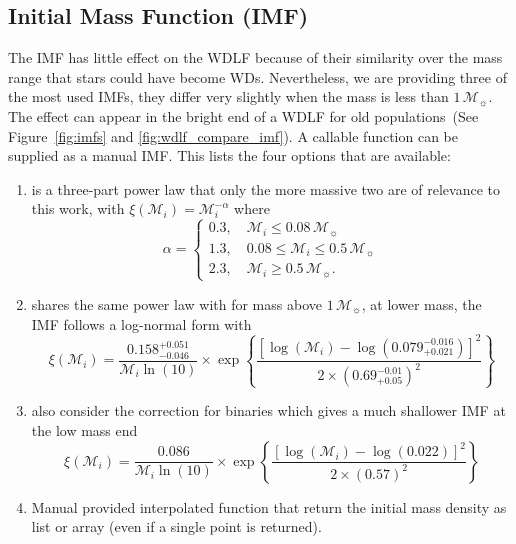 \documentclass[fleqn,usenatbib]{rasti}
\newcommand{\msun}{\mathcal{M}_{\sun}}
\begin{document}
\subsection{Initial Mass Function (IMF)}
The IMF has little effect on the WDLF because of their similarity over the mass
range that stars could have become WDs. Nevertheless, we are providing three
of the most used IMFs, they differ very slightly when the mass is less than
$1\,\msun$. The effect can appear in the bright end of a WDLF for old
populations~(See Figure~\ref{fig:imfs} and \ref{fig:wdlf_compare_imf}). A
callable function can be supplied as a manual IMF. This lists the four options
that are available:

\begin{enumerate}
    \item \citet{2001MNRAS.322..231K} is a three-part power law that only the
    more massive two are of relevance to this work, with
    $\xi(\mathcal{M}_i) = \mathcal{M}_i^{-\alpha}$ where
    \begin{equation}
        \alpha =
        \begin{cases}
            0.3, \quad \mathcal{M}_i \leq 0.08\,\msun\\
            1.3, \quad 0.08 \leq \mathcal{M}_i \leq 0.5\,\msun\\
            2.3, \quad \mathcal{M}_i \geq 0.5\,\msun.
        \end{cases}
    \end{equation}
    \item \citet{2003PASP..115..763C} shares the same power law with
    \citet{2001MNRAS.322..231K} for mass above $1\,\msun$, at lower mass,
    the IMF follows a log-normal form with
    \begin{equation}
        \xi(\mathcal{M}_i) = \dfrac{0.158^{+0.051}_{-0.046}}{\mathcal{M}_i \ln(10)} \times
            \exp{\left\{\dfrac{\left[\log(\mathcal{M}_i) - \log\left(0.079^{-0.016}_{+0.021}\right)\right]^2}{2 \times (0.69^{-0.01}_{+0.05})^2}\right\}}
    \end{equation}
    \item \citet[][including binary]{2003PASP..115..763C} also consider the correction for binaries which gives a much shallower IMF at the low mass end
    \begin{equation}
        \xi(\mathcal{M}_i) = \dfrac{0.086}{\mathcal{M}_i \ln(10)} \times
            \exp{\left\{\dfrac{\left[\log(\mathcal{M}_i) - \log\left(0.022\right)\right]^2}{2 \times (0.57)^2}\right\}}
    \end{equation}
    \item Manual provided interpolated function that return the initial mass density as list or array (even if a single point is returned).
\end{enumerate}
\end{document}
